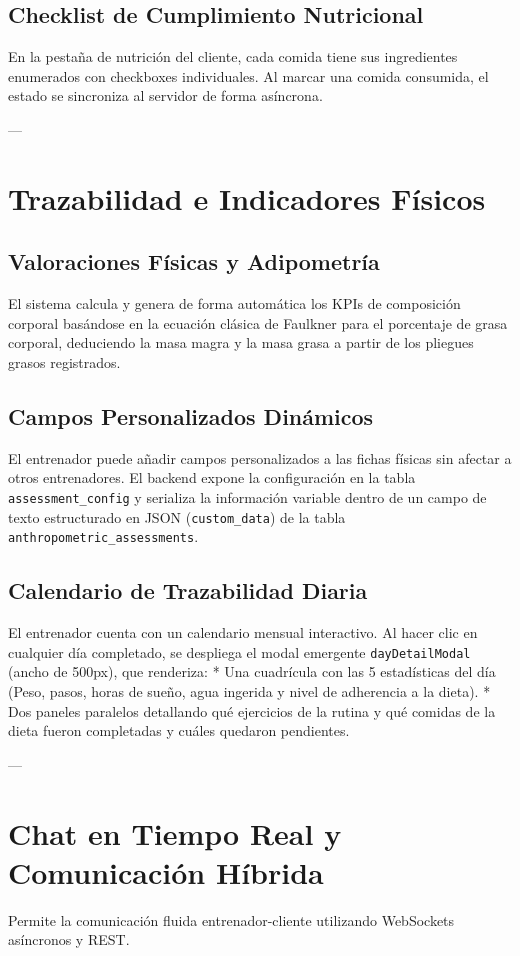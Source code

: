 \documentclass[11pt]{article}
\begin{document}
\subsection{Checklist de Cumplimiento Nutricional}
En la pestaña de nutrición del cliente, cada comida tiene sus ingredientes enumerados con checkboxes individuales. Al marcar una comida consumida, el estado se sincroniza al servidor de forma asíncrona.

---

\section{Trazabilidad e Indicadores Físicos}

\subsection{Valoraciones Físicas y Adipometría}
El sistema calcula y genera de forma automática los KPIs de composición corporal basándose en la ecuación clásica de Faulkner para el porcentaje de grasa corporal, deduciendo la masa magra y la masa grasa a partir de los pliegues grasos registrados.

\subsection{Campos Personalizados Dinámicos}
El entrenador puede añadir campos personalizados a las fichas físicas sin afectar a otros entrenadores. El backend expone la configuración en la tabla \texttt{assessment\_config} y serializa la información variable dentro de un campo de texto estructurado en JSON (\texttt{custom\_data}) de la tabla \texttt{anthropometric\_assessments}.

\subsection{Calendario de Trazabilidad Diaria}
El entrenador cuenta con un calendario mensual interactivo. Al hacer clic en cualquier día completado, se despliega el modal emergente \texttt{dayDetailModal} (ancho de 500px), que renderiza:
* Una cuadrícula con las 5 estadísticas del día (Peso, pasos, horas de sueño, agua ingerida y nivel de adherencia a la dieta).
* Dos paneles paralelos detallando qué ejercicios de la rutina y qué comidas de la dieta fueron completadas y cuáles quedaron pendientes.

---

\section{Chat en Tiempo Real y Comunicación Híbrida}
Permite la comunicación fluida entrenador-cliente utilizando WebSockets asíncronos y REST.
\end{document}
